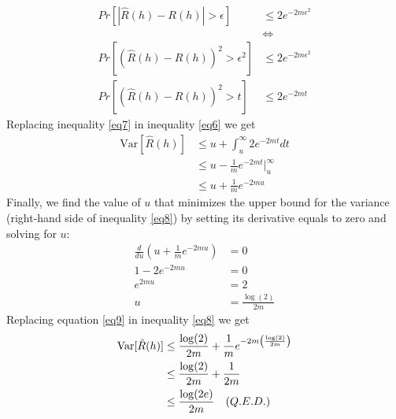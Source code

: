 \documentclass{article}
\begin{document}
\begin{enumerate}[1.]
\begin{align}
            Pr[|\hat{R}(h)-R(h)|>\epsilon] &\leq 2e^{-2m\epsilon^2} \nonumber \\
                                           &\iff \nonumber \\
            Pr[(\hat{R}(h)-R(h))^2>\epsilon^2] &\leq 2e^{-2m\epsilon^2} \nonumber \\
            Pr[(\hat{R}(h)-R(h))^2>t] &\leq 2e^{-2mt} \label{eq7}                              
        \end{align}
        Replacing inequality \ref{eq7} in inequality \ref{eq6} we get
        \begin{align}
            \text{Var}[\hat{R}(h)] &\leq u + \int_u^{\infty}2e^{-2mt}dt \nonumber \\
                                   &\leq u - \frac{1}{m}e^{-2mt}\bigg\rvert_u^{\infty} \nonumber \\
                                   &\leq u + \frac{1}{m}e^{-2mu} \label{eq8}
        \end{align}
        Finally, we find the value of $u$ that minimizes the upper bound for the variance (right-hand side of inequality \ref{eq8}) by setting its derivative equals to zero and solving for $u$:
        \begin{align}
            \frac{d}{du}\left(u + \frac{1}{m}e^{-2mu}\right) &= 0 \nonumber \\
            1 - 2e^{-2mu} &= 0 \nonumber \\
            e^{2mu} &= 2 \nonumber \\
            u &= \frac{\log(2)}{2m} \label{eq9}
        \end{align}
        Replacing equation \ref{eq9} in inequality \ref{eq8} we get
        \begin{align*}
            \text{Var}[\hat{R}(h)] &\leq \frac{\log(2)}{2m} + \frac{1}{m}e^{-2m\left(\frac{\log(2)}{2m}\right)} \\
                                   &\leq \frac{\log(2)}{2m} + \frac{1}{2m} \\
                                   &\leq \frac{\log(2e)}{2m} \textit \quad {(Q.E.D.)}
        \end{align*}
    \end{enumerate}
\clearpage
\end{document}
